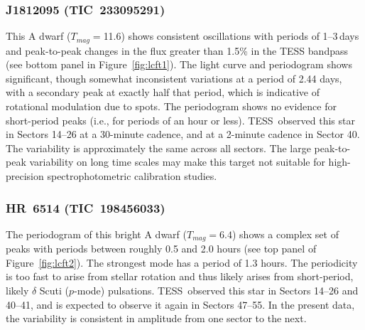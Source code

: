 \documentclass[twocolumn]{aastex631}
\newcommand{\webb}{JWST}
\newcommand{\tess}{TESS}
\begin{document}
\subsubsection{J1812095 (TIC~233095291)}

This A dwarf ($T_{mag}=$11.6) shows consistent oscillations with periods of 1--3\,days and peak-to-peak changes in the flux greater than 1.5\% in the TESS bandpass (see bottom panel in Figure~\ref{fig:lcft1}).  The light curve and periodogram shows significant, though somewhat inconsistent variations at a period of 2.44 days, with a secondary peak at exactly half that period, which is indicative of rotational modulation due to spots.  The periodogram shows no evidence for short-period peaks (i.e., for periods of an hour or less).  \tess\ observed this star in Sectors 14--26 at a 30-minute cadence, and at a 2-minute cadence in Sector 40.  The variability is approximately the same across all sectors. The large peak-to-peak variability on long time scales may make this target not suitable for high-precision spectrophotometric calibration studies.



\subsubsection{HR~6514 (TIC~198456033)} %

The periodogram of this bright A dwarf ($T_{mag}=6.4$) shows a complex set of peaks with periods between roughly 0.5 and 2.0 hours (see top panel of Figure~\ref{fig:lcft2}).  The strongest mode has a period of 1.3 hours.  The periodicity is too fast to arise from stellar rotation and thus likely arises from short-period, likely $\delta$ Scuti ($p$-mode) pulsations.  \tess\ observed this star in Sectors 14--26 and 40--41, and is expected to observe it again in Sectors 47--55.  In the present data, the variability is consistent in amplitude from one sector to the next. 

\end{document}
